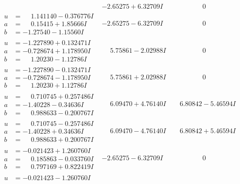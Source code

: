 \documentclass[1p]{elsarticle_modified}
\theoremstyle{definition}
\begin{document}
$$\begin{array}{c|c|c}
 & -2.65275 + 6.32709 I & \phantom{-0.000000 } 0 \\ \hline\begin{aligned}
u &= \phantom{-}1.141140 - 0.376776 I \\
a &= \phantom{-}0.15415 + 1.85666 I \\
b &= -1.27540 - 1.15560 I\end{aligned}
 & -2.65275 - 6.32709 I & \phantom{-0.000000 } 0 \\ \hline\begin{aligned}
u &= -1.227890 + 0.132471 I \\
a &= -0.728674 + 1.178950 I \\
b &= \phantom{-}1.20230 - 1.12786 I\end{aligned}
 & \phantom{-}5.75861 - 2.02988 I & \phantom{-0.000000 } 0 \\ \hline\begin{aligned}
u &= -1.227890 - 0.132471 I \\
a &= -0.728674 - 1.178950 I \\
b &= \phantom{-}1.20230 + 1.12786 I\end{aligned}
 & \phantom{-}5.75861 + 2.02988 I & \phantom{-0.000000 } 0 \\ \hline\begin{aligned}
u &= \phantom{-}0.710745 + 0.257486 I \\
a &= -1.40228 - 0.34636 I \\
b &= \phantom{-}0.988633 - 0.200767 I\end{aligned}
 & \phantom{-}6.09470 + 4.76140 I & \phantom{-}6.80842 - 5.46594 I \\ \hline\begin{aligned}
u &= \phantom{-}0.710745 - 0.257486 I \\
a &= -1.40228 + 0.34636 I \\
b &= \phantom{-}0.988633 + 0.200767 I\end{aligned}
 & \phantom{-}6.09470 - 4.76140 I & \phantom{-}6.80842 + 5.46594 I \\ \hline\begin{aligned}
u &= -0.021423 + 1.260760 I \\
a &= \phantom{-}0.185863 - 0.033760 I \\
b &= \phantom{-}0.797169 + 0.822419 I\end{aligned}
 & -2.65275 - 6.32709 I & \phantom{-0.000000 } 0 \\ \hline\begin{aligned}
u &= -0.021423 - 1.260760 I \\

\end{aligned}
\end{array}$$
\end{document}
